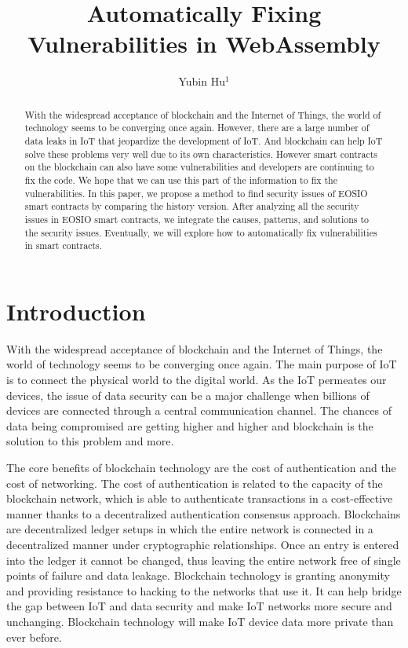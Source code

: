 \documentclass[a4paper, 10pt, conference, twocolumn]{ieeeconf}       %
\title{\LARGE \bf
Automatically Fixing Vulnerabilities in WebAssembly
}
\author{Yubin Hu$^{1}$ %
}
\begin{document}
\maketitle
\thispagestyle{empty}
\pagestyle{empty}


\begin{abstract}

With the widespread acceptance of blockchain and the Internet of Things, the world of technology seems to be converging once again. 
However, there are a large number of data leaks in IoT that jeopardize the development of IoT. 
And blockchain can help IoT solve these problems very well due to its own characteristics.
However smart contracts on the blockchain can also have some vulnerabilities and developers are continuing to fix the code. 
We hope that we can use this part of the information to fix the vulnerabilities.
In this paper, we propose a method to find security issues of EOSIO smart contracts by comparing the history version.
After analyzing all the security issues in EOSIO smart contracts,
we integrate the causes, patterns, and solutions to the security issues.
Eventually, we will explore how to automatically fix vulnerabilities in smart contracts.

\end{abstract}


\section{Introduction}

With the widespread acceptance of blockchain and the Internet of Things, the world of technology seems to be converging once again. 
The main purpose of IoT is to connect the physical world to the digital world. 
As the IoT permeates our devices, the issue of data security can be a major challenge when billions of devices are connected through a central communication channel.
The chances of data being compromised are getting higher and higher and blockchain is the solution to this problem and more.

The core benefits of blockchain technology are the cost of authentication and the cost of networking.
The cost of authentication is related to the capacity of the blockchain network, which is able to authenticate transactions in a cost-effective manner thanks to a decentralized authentication consensus approach.
Blockchains are decentralized ledger setups in which the entire network is connected in a decentralized manner under cryptographic relationships. Once an entry is entered into the ledger it cannot be changed, thus leaving the entire network free of single points of failure and data leakage.
Blockchain technology is granting anonymity and providing resistance to hacking to the networks that use it.
It can help bridge the gap between IoT and data security and make IoT networks more secure and unchanging.
Blockchain technology will make IoT device data more private than ever before.
\end{document}
